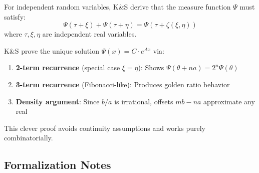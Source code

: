 \documentclass[11pt]{article}
\theoremstyle{definition}
\theoremstyle{remark}
\begin{document}
For independent random variables, K\&S derive that the measure function $\Psi$ must satisfy:
\[\Psi(\tau + \xi) + \Psi(\tau + \eta) = \Psi(\tau + \zeta(\xi, \eta))\]
where $\tau, \xi, \eta$ are independent real variables.

K\&S prove the unique solution $\Psi(x) = C \cdot e^{Ax}$ via:
\begin{enumerate}
\item \textbf{2-term recurrence} (special case $\xi = \eta$): Shows $\Psi(\theta + na) = 2^n \Psi(\theta)$
\item \textbf{3-term recurrence} (Fibonacci-like): Produces golden ratio behavior
\item \textbf{Density argument}: Since $b/a$ is irrational, offsets $mb - na$ approximate any real
\end{enumerate}

This clever proof avoids continuity assumptions and works purely combinatorially.

\subsection{Formalization Notes}
\end{document}
